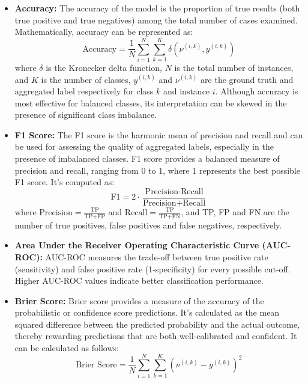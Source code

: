 \begin{itemize}
%
\item \textbf{Accuracy:} The accuracy of the model is the proportion of true results (both true positive and true negatives) among the total number of cases examined. Mathematically, accuracy can be represented as:
\begin{equation}
\text{Accuracy}= \frac{1}{N} \sum_{i=1}^{N} \sum_{k=1}^{K} \delta\left(\nu^{(i,k)}, y^{(i,k)}\right)
\end{equation}
where $\delta$ is the Kronecker delta function, $N$ is the total number of instances, and $K$ is the number of classes, $y^{(i,k)}$ and $\nu^{(i,k)}$ are the ground truth and aggregated label respectively for class $k$ and instance $i$. Although accuracy is most effective for balanced classes, its interpretation can be skewed in the presence of significant class imbalance.
%
\item \textbf{F1 Score:} The F1 score is the harmonic mean of precision and recall and can be used for assessing the quality of aggregated labels, especially in the presence of imbalanced classes. F1 score provides a balanced measure of precision and recall, ranging from 0 to 1, where 1 represents the best possible F1 score. It's computed as:
\begin{equation}
\text{F1} = 2 \cdot \frac{\text{Precision} \cdot \text{Recall}}{\text{Precision} + \text{Recall}}
\end{equation}
where $\text{Precision} = \frac{\text{TP}}{\text{TP+FP}}$ and $\text{Recall} = \frac{\text{TP}}{\text{TP+FN}}$, and TP, FP and FN are the number of true positives, false positives and false negatives, respectively.
%
\item \textbf{Area Under the Receiver Operating Characteristic Curve (AUC-ROC):} AUC-ROC measures the trade-off between true positive rate (sensitivity) and false positive rate (1-specificity) for every possible cut-off. Higher AUC-ROC values indicate better classification performance.
%
\item \textbf{Brier Score:} Brier score provides a measure of the accuracy of the probabilistic or confidence score predictions. It's calculated as the mean squared difference between the predicted probability and the actual outcome, thereby rewarding predictions that are both well-calibrated and confident. It can be calculated as follows:
\begin{equation}
\text{Brier Score} = \frac{1}{N} \sum_{i=1}^{N} \sum_{k=1}^{K} {\left(\nu^{(i,k)} - y^{(i,k)}\right)}^2
\end{equation}

\end{itemize}
